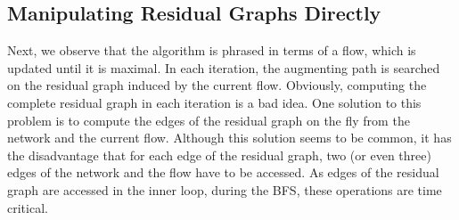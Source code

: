 \documentclass{llncs}
\begin{document}
%   
% 
%   
%   
     
  \subsection{Manipulating Residual Graphs Directly}\label{sec:impl_res_graph}
  Next, we observe that the algorithm is phrased in terms of a flow, which is updated until it is maximal. 
  In each iteration, the augmenting path is searched on the residual graph induced by the current flow.
  Obviously, computing the complete residual graph in each iteration is a bad idea. 
  One solution to this problem is to compute the edges of the residual graph on the fly from the network and the current flow.
  Although this solution seems to be common, it has the disadvantage that for each edge of the residual graph, two (or even three) 
  edges of the network and the flow have to be accessed. As edges of the residual graph are accessed in the inner loop, during 
  the BFS, these operations are time critical.
  
\end{document}
